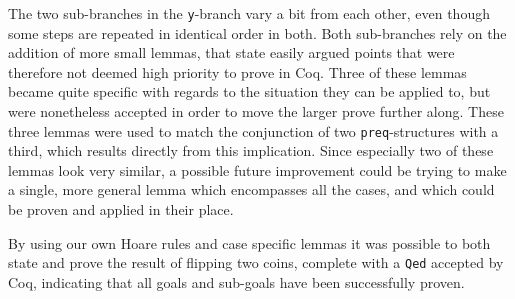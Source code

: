 The two sub-branches in the \texttt{y}-branch vary a bit from each other, even though some steps are repeated in identical order in both. Both sub-branches rely on the addition of more small lemmas, that state easily argued points that were therefore not deemed high priority to prove in Coq. Three of these lemmas became quite specific with regards to the situation they can be applied to, but were nonetheless accepted in order to move the larger prove further along. These three lemmas were used to match the conjunction of two \texttt{preq}-structures with a third, which results directly from this implication. Since especially two of these lemmas look very similar, a possible future improvement could be trying to make a single, more general lemma which encompasses all the cases, and which could be proven and applied in their place. 

By using our own Hoare rules and case specific lemmas it was possible to both state and prove the result of flipping two coins, complete with a \texttt{Qed} accepted by Coq, indicating that all goals and sub-goals have been successfully proven. 






